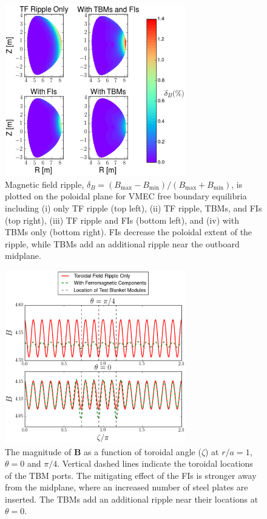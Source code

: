 \documentclass[aip, pop, preprint]{revtex4-1}
\numberwithin{figure}{section}
\numberwithin{equation}{section}
\begin{document}
\begin{figure}[h!]
\centering
\includegraphics[width=0.7\textwidth]{figure2.eps}
\caption{\label{fig:ripplecontour} Magnetic field ripple, $\delta_B = (B_{\mathrm{max}}-B_{\mathrm{min}})/(B_{\mathrm{max}} + B_{\mathrm{min}})$, is plotted on the poloidal plane for VMEC free boundary equilibria including (i) only TF ripple (top left), (ii) TF ripple, TBMs, and FIs (top right), (iii) TF ripple and FIs (bottom left), and (iv) with TBMs only (bottom right). FIs decrease the poloidal extent of the ripple, while TBMs add an additional ripple near the outboard midplane.}
\end{figure}

\begin{figure}[h!]
\centering
\includegraphics[width=0.7\textwidth]{figure3.eps}
\caption{\label{fig:toroidalripple} The magnitude of $\bm{B}$ as a function of toroidal angle ($\zeta$) at $r/a = 1$, $\theta = 0$ and $\pi/4$. Vertical dashed lines indicate the toroidal locations of the TBM ports. The mitigating effect of the FIs is stronger away from the midplane, where an increased number of steel plates are inserted. The TBMs add an additional ripple near their locations at $\theta = 0$. }
\end{figure}
\end{document}
